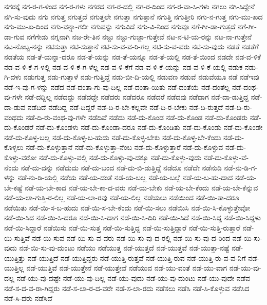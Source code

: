 {ನಗರಕ್ಕೆ
ನಗ-ರ-ಗ-ಳಿಂದ
ನಗ-ರ-ಗಳು
ನಗರದ
ನಗ-ರ-ದಲ್ಲಿ
ನಗ-ರ-ದಿಂದ
ನಗ-ರ-ವಾ-ಸಿ-ಗಳು
ನಗಲು
ನಗಿ-ಸಿದ್ದೇನೆ
ನಗಿ-ಸು-ವುದು
ನಗು
ನಗುತ್ತ
ನಗುತ್ತದೆ
ನಗುತ್ತಲೇ
ನಗುತ್ತಾ
ನಗುತ್ತಾನೆ
ನಗುತ್ತಿ
ನಗುತ್ತೀರಿ
ನಗು-ನ-ಗುತ್ತ
ನಗು-ಮು-ಖದ
ನಗು-ಮು-ಖ-ದಿಂದ
ನಗು-ವನ್ನಾ-ಗಲೀ
ನಗುವನ್ನು
ನಗುವಿದೆ
ನಗು-ವಿ-ನಿಂದ
ನಗುವೂ
ನಗೆ-ಗೀ-ಡಾ-ಗುತ್ತದೆ
ನಗೆ-ಗೀ-ಡಾ-ಗುವ
ನಗೆಗೇಡು
ನಗ್ನನಾಗಿ
ನಜ-ರೇ-ತಿನ
ನಜ್ಜು
ನಜ್ಜು-ಗುಜ್ಜಾ-ಗುತ್ತೇವೆ
ನಟ-ನ-ಟಿ-ಯ-ರನ್ನು
ನಟ-ನಾ-ಗುತ್ತೇನೆ
ನಟ-ನೊಬ್ಬ-ನನ್ನು
ನಟಿಸುತ್ತಾ
ನಟಿ-ಸುತ್ತಾನೆ
ನಟಿ-ಸು-ವ-ವ-ರಿ-ಗಲ್ಲ
ನಟಿ-ಸು-ವ-ವರು
ನಟಿ-ಸು-ವುದು
ನಡತೆ
ನಡತೆಗೆ
ನಡತೆಯ
ನಡ-ತೆ-ಯನ್ನಾ-ದರೂ
ನಡ-ತೆ-ಯನ್ನು
ನಡ-ತೆ-ಯನ್ನೂ
ನಡ-ತೆ-ಯಲ್ಲಿ
ನಡ-ತೆ-ಯಿಂದ
ನಡದೇ
ನಡ-ವ-ಳಿಕೆ
ನಡ-ವ-ಳಿ-ಕೆ-ಗ-ಳಲ್ಲಿ
ನಡ-ವ-ಳಿ-ಕೆ-ಗ-ಳೆಲ್ಲ
ನಡ-ವ-ಳಿ-ಕೆಗೆ
ನಡ-ವ-ಳಿ-ಕೆ-ಯನ್ನು
ನಡ-ವ-ಳಿ-ಕೆ-ಯಲ್ಲಿ
ನಡುಕ
ನಡು-ಗಿ-ದಳು
ನಡುಗುತ್ತ
ನಡು-ಗುತ್ತಾಳೆ
ನಡು-ಗುತ್ತಿದ್ದೆ
ನಡು-ಬೀ-ದಿ-ಯಲ್ಲಿ
ನಡುವಣ
ನಡುವೆ
ನಡುವೆಯೂ
ನಡೆ
ನಡೆಇವು
ನಡೆ-ಇ-ವು-ಗ-ಳನ್ನು
ನಡೆದ
ನಡೆ-ದಂತಾ-ಗು-ವು-ದಿಲ್ಲ
ನಡೆ-ದಂತಾ-ಯಿತು
ನಡೆ-ದಂತೆಯೆ
ನಡೆ-ದಂತೆಲ್ಲ
ನಡೆ-ದಂಥ-ವು-ಗಳೇ
ನಡೆ-ದದ್ದಿಲ್ಲ
ನಡೆದದ್ದು
ನಡೆದದ್ದೇ
ನಡೆದರು
ನಡೆದರೂ
ನಡೆದರೆ
ನಡೆದವು
ನಡೆದಾಗ
ನಡೆ-ದಾ-ಡುತ್ತಿದ್ದ
ನಡೆ-ದಾ-ಡುವ
ನಡೆದಿದೆ
ನಡೆದಿದ್ದ
ನಡೆ-ದಿದ್ದರೆ
ನಡೆ-ದಿ-ರ-ಬೇ-ಕಲ್ಲವೇ
ನಡೆ-ದಿ-ರ-ಬೇಕು
ನಡೆ-ದಿ-ರುತ್ತದೆ
ನಡೆ-ದಿ-ರು-ವಂಥದು
ನಡೆ-ದಿ-ರು-ವಂಥ-ವು-ಗಳೇ
ನಡೆದಿವೆ
ನಡೆದು
ನಡೆ-ದು-ಕೊಂಡ
ನಡೆ-ದು-ಕೊಂಡ
ನಡೆ-ದು-ಕೊಂಡರು
ನಡೆ-ದು-ಕೊಂಡರೆ
ನಡೆ-ದು-ಕೊಂಡಳು
ನಡೆ-ದು-ಕೊಂಡಾ-ದರೂ
ನಡೆ-ದು-ಕೊಂಡಿತು
ನಡೆ-ದು-ಕೊಂಡು
ನಡೆ-ದು-ಕೊಂಡೇ
ನಡೆ-ದು-ಕೊಳ್ಳ-ಬಲ್ಲ
ನಡೆ-ದು-ಕೊಳ್ಳ-ಬ-ಹುದು
ನಡೆ-ದು-ಕೊಳ್ಳ-ಬೇಕು
ನಡೆ-ದು-ಕೊಳ್ಳ-ಬೇ-ಕೆಂದು
ನಡೆ-ದು-ಕೊಳ್ಳಲು
ನಡೆ-ದು-ಕೊಳ್ಳುತ್ತಾನೆ
ನಡೆ-ದು-ಕೊಳ್ಳುತ್ತಾ-ನೆಂಬ
ನಡೆ-ದು-ಕೊಳ್ಳುತ್ತಾರೆ
ನಡೆ-ದು-ಕೊಳ್ಳುವ
ನಡೆ-ದು-ಕೊಳ್ಳು-ವರೋ
ನಡೆ-ದು-ಕೊಳ್ಳು-ವಲ್ಲಿ
ನಡೆ-ದು-ಕೊಳ್ಳು-ವು-ದಕ್ಕೂ
ನಡೆ-ದು-ಕೊಳ್ಳು-ವುದು
ನಡೆ-ದು-ಕೊಳ್ಳು-ವೆ-ನೆಂದು
ನಡೆ-ದು-ದನ್ನು
ನಡೆದುದು
ನಡೆ-ದು-ಬಂದ
ನಡೆ-ದು-ಬಿ-ಡುತ್ತಿದ್ದೆ
ನಡೆದೂ
ನಡೆದೇ
ನಡೆನುಡಿ
ನಡೆ-ನು-ಡಿ-ಗ-ಳನ್ನು
ನಡೆ-ನು-ಡಿ-ಯಲ್ಲಿ
ನಡೆಯ
ನಡೆ-ಯ-ದಂತೆ
ನಡೆ-ಯ-ಬಲ್ಲ
ನಡೆ-ಯ-ಬಲ್ಲೆ
ನಡೆ-ಯ-ಬ-ಹು-ದಾದ
ನಡೆ-ಯ-ಬೇ-ಕಷ್ಟೆ
ನಡೆ-ಯ-ಬೇ-ಕಾದ
ನಡೆ-ಯ-ಬೇ-ಕಾ-ದ-ವರು
ನಡೆ-ಯ-ಬೇಕು
ನಡೆ-ಯ-ಬೇ-ಕೆಂದು
ನಡೆ-ಯ-ಬೇ-ಕೆನ್ನುವ
ನಡೆ-ಯ-ಲಾ-ಗುತ್ತಿ-ರ-ಲಿಲ್ಲ
ನಡೆ-ಯ-ಲಾ-ರವು
ನಡೆ-ಯ-ಲಿಲ್ಲ
ನಡೆಯಲು
ನಡೆಯಿಂದ
ನಡೆ-ಯಿ-ತಾ-ದರೂ
ನಡೆಯಿತು
ನಡೆ-ಯಿ-ಸ-ಬ-ಹುದು
ನಡೆ-ಯಿ-ಸ-ಬೇ-ಕೆಂದು
ನಡೆ-ಯಿ-ಸಲು
ನಡೆಯಿಸಿ
ನಡೆ-ಯಿ-ಸಿ-ಕೊಳ್ಳುತ್ತೇವೋ
ನಡೆ-ಯಿ-ಸಿದ
ನಡೆ-ಯಿ-ಸಿ-ದರೂ
ನಡೆ-ಯಿ-ಸಿ-ದಾಗ
ನಡೆ-ಯಿ-ಸಿ-ದಿರಿ
ನಡೆ-ಯಿ-ಸಿದೆ
ನಡೆ-ಯಿ-ಸಿದ್ದ
ನಡೆ-ಯಿ-ಸಿದ್ದಳು
ನಡೆ-ಯಿ-ಸಿದ್ದಾರೆ
ನಡೆಯಿಸು
ನಡೆ-ಯಿ-ಸುತ್ತ
ನಡೆ-ಯಿ-ಸುತ್ತಿದ್ದ
ನಡೆ-ಯಿ-ಸುತ್ತಿದ್ದಾರೆ
ನಡೆ-ಯಿ-ಸುತ್ತಿ-ರುತ್ತಾರೆ
ನಡೆ-ಯಿ-ಸುತ್ತಿವೆ
ನಡೆ-ಯಿ-ಸುವ
ನಡೆ-ಯಿ-ಸು-ವ-ವರು
ನಡೆ-ಯಿ-ಸು-ವು-ದ-ರಲ್ಲಿ
ನಡೆ-ಯಿ-ಸು-ವು-ದ-ರಿಂದ
ನಡೆ-ಯಿ-ಸು-ವುದು
ನಡೆ-ಯಿ-ಸು-ವು-ದುಂಟು
ನಡೆಯು
ನಡೆಯುತ್ತ
ನಡೆ-ಯುತ್ತದೆ
ನಡೆ-ಯುತ್ತವೆ
ನಡೆ-ಯುತ್ತಾ-ನಷ್ಟೆ
ನಡೆ-ಯುತ್ತಿತ್ತು
ನಡೆ-ಯುತ್ತಿದೆ
ನಡೆ-ಯುತ್ತಿದ್ದರು
ನಡೆ-ಯುತ್ತಿ-ರುತ್ತವೆ
ನಡೆ-ಯುತ್ತಿ-ರುವ
ನಡೆ-ಯುತ್ತಿ-ರು-ವ-ವ-ನಿಗೆ
ನಡೆ-ಯುತ್ತಿಲ್ಲ
ನಡೆ-ಯುತ್ತಿವೆ
ನಡೆ-ಯುತ್ತೇನೆ
ನಡೆ-ಯುತ್ತೇವೆ
ನಡೆಯುವ
ನಡೆ-ಯು-ವಂತೆ
ನಡೆ-ಯು-ವಾಗ
ನಡೆ-ಯು-ವು-ದಲ್ಲ
ನಡೆ-ಯು-ವು-ದಷ್ಟೇ
ನಡೆ-ಯು-ವು-ದಿಲ್ಲ
ನಡೆ-ಯು-ವುದು
ನಡೆ-ಯು-ವು-ದುಂಟು
ನಡೆ-ಯು-ವುದೇ
ನಡೆವ
ನಡೆ-ಸ-ದ-ವ-ರಾ-ಗಿದ್ದರು
ನಡೆ-ಸ-ಲಾ-ರ-ದ-ವರೇ
ನಡೆ-ಸ-ಲಾ-ರದು
ನಡೆಸಲು
ನಡೆಸಿ
ನಡೆ-ಸಿ-ಕೊಳ್ಳುವ
ನಡೆಸಿದ
ನಡೆ-ಸಿ-ದರು
ನಡೆಸಿದೆ
}
